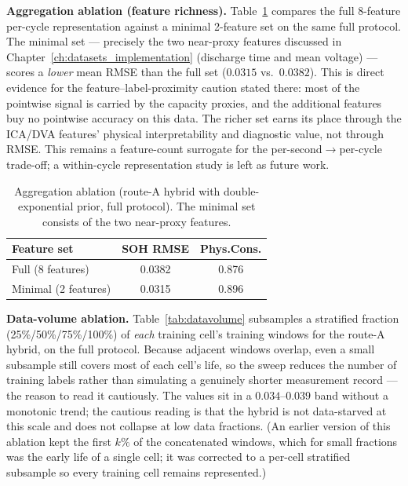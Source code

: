 \textbf{Aggregation ablation (feature richness).}
Table~\ref{tab:aggregation} compares the full 8-feature per-cycle representation
against a minimal 2-feature set on the same full protocol. The minimal set ---
precisely the two near-proxy features discussed in
Chapter~\ref{ch:datasets_implementation} (discharge time and mean voltage) ---
scores a \emph{lower} mean RMSE than the full set ($0.0315$ vs.\ $0.0382$).
This is direct evidence for the feature--label-proximity caution stated there:
most of the pointwise signal is carried by the capacity proxies, and the
additional features buy no pointwise accuracy on this data. The richer set
earns its place through the ICA/DVA features' physical interpretability and
diagnostic value, not through RMSE. This remains a feature-count surrogate for
the per-second$\rightarrow$per-cycle trade-off; a within-cycle representation
study is left as future work.

\begin{table}[H]
\centering
\caption{Aggregation ablation (route-A hybrid with double-exponential prior,
full protocol). The minimal set consists of the two near-proxy features.}
\label{tab:aggregation}
\begin{tabular}{l c c}
\toprule
\textbf{Feature set} & \textbf{SOH RMSE} & \textbf{Phys.Cons.} \\
\midrule
Full (8 features)    & 0.0382 & 0.876 \\
Minimal (2 features) & 0.0315 & 0.896 \\
\bottomrule
\end{tabular}
\end{table}

\textbf{Data-volume ablation.} Table~\ref{tab:datavolume} subsamples a stratified
fraction (25\%/50\%/75\%/100\%) of \emph{each} training cell's training windows for the
route-A hybrid, on the full protocol. Because adjacent windows overlap, even a
small subsample still covers most of each cell's life, so the sweep reduces the
number of training labels rather than simulating a genuinely shorter
measurement record --- the reason to read it cautiously. The values sit in a
$0.034$--$0.039$ band without a monotonic trend; the cautious reading is that
the hybrid is not data-starved at this scale and does not collapse at low data
fractions. (An earlier version of this ablation kept the first $k\%$ of the
concatenated windows, which for small fractions was the early life of a single
cell; it was corrected to a per-cell stratified subsample so every training cell
remains represented.)

